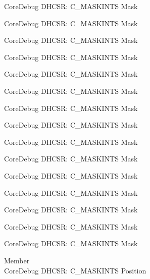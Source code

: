 \begin{DoxyRefList}
\label{deprecated__deprecated000122}%
%
Core\+Debug DHCSR\+: C\+\_\+\+MASKINTS Mask 

\label{deprecated__deprecated000178}%
%
Core\+Debug DHCSR\+: C\+\_\+\+MASKINTS Mask 

\label{deprecated__deprecated000261}%
%
Core\+Debug DHCSR\+: C\+\_\+\+MASKINTS Mask 

\label{deprecated__deprecated000320}%
%
Core\+Debug DHCSR\+: C\+\_\+\+MASKINTS Mask 

\label{deprecated__deprecated000396}%
%
Core\+Debug DHCSR\+: C\+\_\+\+MASKINTS Mask 

\label{deprecated__deprecated000485}%
%
Core\+Debug DHCSR\+: C\+\_\+\+MASKINTS Mask 

\label{deprecated__deprecated000587}%
%
Core\+Debug DHCSR\+: C\+\_\+\+MASKINTS Mask 

\label{deprecated__deprecated000693}%
%
Core\+Debug DHCSR\+: C\+\_\+\+MASKINTS Mask 

\label{deprecated__deprecated000781}%
%
Core\+Debug DHCSR\+: C\+\_\+\+MASKINTS Mask 

\label{deprecated__deprecated000837}%
%
Core\+Debug DHCSR\+: C\+\_\+\+MASKINTS Mask 

\label{deprecated__deprecated000920}%
%
Core\+Debug DHCSR\+: C\+\_\+\+MASKINTS Mask 

\label{deprecated__deprecated000979}%
%
Core\+Debug DHCSR\+: C\+\_\+\+MASKINTS Mask 

\label{deprecated__deprecated001055}%
%
Core\+Debug DHCSR\+: C\+\_\+\+MASKINTS Mask 

\label{deprecated__deprecated001144}%
%
Core\+Debug DHCSR\+: C\+\_\+\+MASKINTS Mask 

\label{deprecated__deprecated001246}%
%
Core\+Debug DHCSR\+: C\+\_\+\+MASKINTS Mask  
\item[Member \doxylink{group___c_m_s_i_s___core_debug_ga0d2907400eb948a4ea3886ca083ec8e3}{Core\+Debug\+\_\+\+DHCSR\+\_\+\+C\+\_\+\+MASKINTS\+\_\+\+Pos} ]\hfill \\
\label{deprecated__deprecated000033}%
%
Core\+Debug DHCSR\+: C\+\_\+\+MASKINTS Position 


\end{DoxyRefList}

